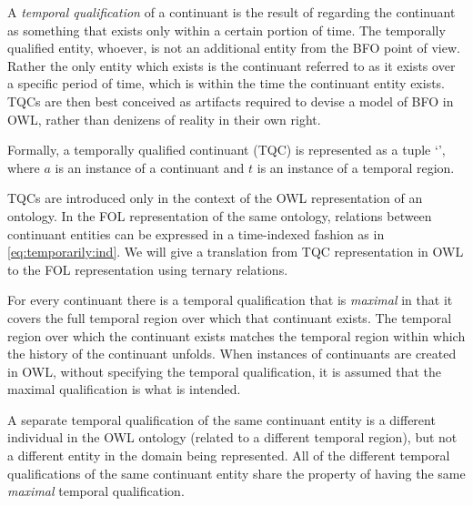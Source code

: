 A \emph{temporal qualification} of a
continuant is the result of regarding the continuant as something that exists only
within a certain portion of time. The temporally qualified entity, whoever, is
not an additional entity from the BFO point of view. 
Rather the only entity which exists is the continuant referred to as it exists 
over a specific period of time, which is within the time the continuant entity
exists. TQCs are then best conceived as artifacts required to devise a model of BFO in OWL, 
rather than denizens of reality in their own right.

Formally, a temporally qualified continuant (TQC) is represented as a tuple `',
where $a$ is an instance
of a continuant and $t$ is an instance of a temporal region.

TQCs are introduced only in the context of the OWL representation of
an ontology. In the FOL representation of the same ontology, relations between continuant 
entities can be expressed in a time-indexed fashion
as in \ref{eq:temporarily:ind}. 
We will give a translation from TQC representation in OWL to the
FOL representation using ternary relations.

For every continuant there is a temporal qualification that is \textit{maximal} 
in that it covers the full temporal region over which that continuant exists. 
The temporal region over which the continuant exists matches the temporal region 
within which the history of the continuant unfolds. When instances of continuants 
are created in OWL, without specifying the temporal qualification, 
it is assumed that the maximal qualification is what is intended.

A separate temporal qualification of the same continuant entity is 
a different individual in the OWL ontology (related to a different 
temporal region), but not a different entity in the domain being 
represented. All of the different temporal qualifications of the 
same continuant entity share the property of having the same \emph{maximal} 
temporal qualification.

